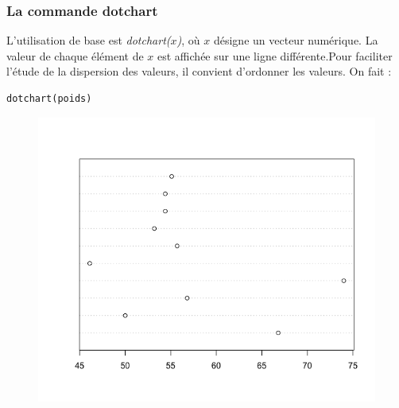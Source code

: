 \subsubsection{La commande dotchart}
L'utilisation de base est \textit{dotchart($x$)}, où $x$ désigne un vecteur numérique.\newline
La valeur de chaque élément de $x$ est affichée sur une ligne différente.Pour faciliter l'étude de la dispersion des valeurs, il convient d'ordonner les valeurs.\newline
On fait :
\begin{lstlisting}[language=html]
dotchart(poids)
\end{lstlisting}
\begin{figure}[H]\begin{center}\includegraphics[scale=0.4]{ilu/gra6.png}\end{center}\end{figure}

